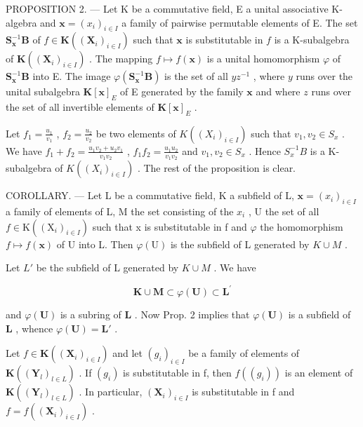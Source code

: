PROPOSITION 2. --- Let K be a commutative field, E a unital associative K-algebra and \(\mathbf{x} = (x_i)_{i \in I}\) a family of pairwise permutable elements of E. The set \(\mathbf{S}_{\mathbf{x}}^{-1}\mathbf{B}\) of \(f \in \mathbf{K}((\mathbf{X}_i)_{i \in I})\) such that \(\mathbf{x}\) is substitutable in \(f\) is a K-subalgebra of \(\mathbf{K}((\mathbf{X}_i)_{i \in I})\) . The mapping \(f \mapsto f(\mathbf{x})\) is a unital homomorphism \(\varphi\) of \(\mathbf{S}_{\mathbf{x}}^{-1}\mathbf{B}\) into E. The image \(\varphi(\mathbf{S}_{\mathbf{x}}^{-1}\mathbf{B})\) is the set of all \(yz^{-1}\) , where \(y\) runs over the unital subalgebra \(\mathbf{K}[\mathbf{x}]_E\) of E generated by the family \(\mathbf{x}\) and where \(z\) runs over the set of all invertible elements of \(\mathbf{K}[\mathbf{x}]_E\) .

Let \(f_{1} = \frac{u_{1}}{v_{1}}\) , \(f_{2} = \frac{u_{2}}{v_{2}}\) be two elements of \(K((X_{i})_{i\in I})\) such that \(v_{1}, v_{2} \in S_{x}\) . We have \(f_{1} + f_{2} = \frac{u_{1}v_{2} + u_{2}v_{1}}{v_{1}v_{2}}\) , \(f_{1}f_{2} = \frac{u_{1}u_{2}}{v_{1}v_{2}}\) and \(v_{1}, v_{2} \in S_{x}\) . Hence \(S_{x}^{-1}B\) is a K-subalgebra of \(K((X_{i})_{i\in I})\) . The rest of the proposition is clear.

COROLLARY. --- Let L be a commutative field, K a subfield of L, \(\mathbf{x} = (x_i)_{i \in I}\) a family of elements of L, M the set consisting of the \(x_i\) , U the set of all \(f \in \mathrm{K}((\mathrm{X}_i)_{i \in I})\) such that x is substitutable in f and \(\varphi\) the homomorphism \(f \mapsto f(\mathbf{x})\) of U into L. Then \(\varphi(\mathrm{U})\) is the subfield of L generated by \(K \cup M\) .

Let \(L'\) be the subfield of L generated by \(K \cup M\) . We have

\[
\mathbf {K} \cup \mathbf {M} \subset \varphi (\mathbf {U}) \subset \mathbf {L} ^ {\prime}
\]

and \(\varphi(\mathbf{U})\) is a subring of \(\mathbf{L}\) . Now Prop. 2 implies that \(\varphi(\mathbf{U})\) is a subfield of \(\mathbf{L}\) , whence \(\varphi(\mathbf{U}) = \mathbf{L}'\) .

Let \(f \in \mathbf{K}((\mathbf{X}_i)_{i \in I})\) and let \((g_i)_{i \in I}\) be a family of elements of \(\mathbf{K}((\mathbf{Y}_l)_{l \in L})\) . If \((g_{i})\) is substitutable in f, then \(f((g_{i}))\) is an element of \(\mathbf{K}((\mathbf{Y}_{l})_{l\in L})\) . In particular, \((\mathbf{X}_{i})_{i\in I}\) is substitutable in f and \(f=f((\mathbf{X}_{i})_{i\in I})\) .

